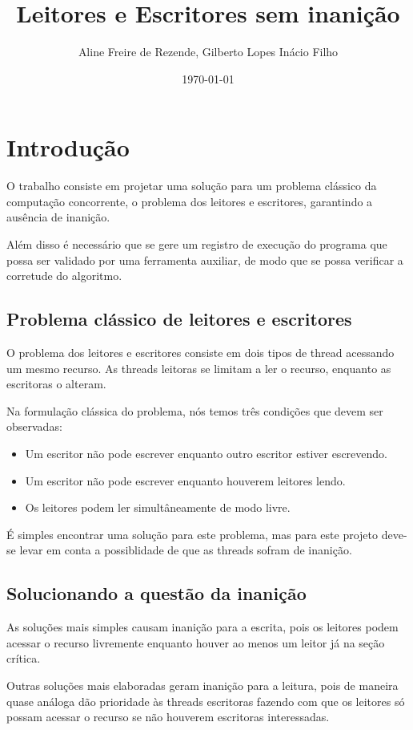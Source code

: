 \documentclass[11pt]{article}
\author{Aline Freire de Rezende, Gilberto Lopes Inácio Filho}
\date{\today}
\title{Leitores e Escritores sem inanição}
\begin{document}
\maketitle
\tableofcontents


\section{Introdução}
\label{sec:org85f9545}
O trabalho consiste em projetar uma solução para um problema clássico da computação
concorrente, o problema dos leitores e escritores, garantindo a ausência de inanição.

Além disso é necessário que se gere um registro de execução do programa que possa
ser validado por uma ferramenta auxiliar, de modo que se possa verificar a corretude
do algoritmo.

\subsection{Problema clássico de leitores e escritores}
\label{sec:org289b97d}
O problema dos leitores e escritores consiste em dois tipos de thread acessando um mesmo
recurso. As threads leitoras se limitam a ler o recurso, enquanto as escritoras o alteram.

Na formulação clássica do problema, nós temos três condições que devem ser observadas:
\begin{itemize}
\item Um escritor não pode escrever enquanto outro escritor estiver escrevendo.
\item Um escritor não pode escrever enquanto houverem leitores lendo.
\item Os leitores podem ler simultâneamente de modo livre.
\end{itemize}

É simples encontrar uma solução para este problema, mas para este projeto deve-se
levar em conta a possiblidade de que as threads sofram de inanição.

\subsection{Solucionando a questão da inanição}
\label{sec:org9454bc3}
As soluções mais simples causam inanição para a escrita, pois os leitores podem
acessar o recurso livremente enquanto houver ao menos um leitor já na seção crítica.

Outras soluções mais elaboradas geram inanição para a leitura, pois de maneira
quase análoga dão prioridade às threads escritoras fazendo com que os leitores só
possam acessar o recurso se não houverem escritoras interessadas.
\end{document}
